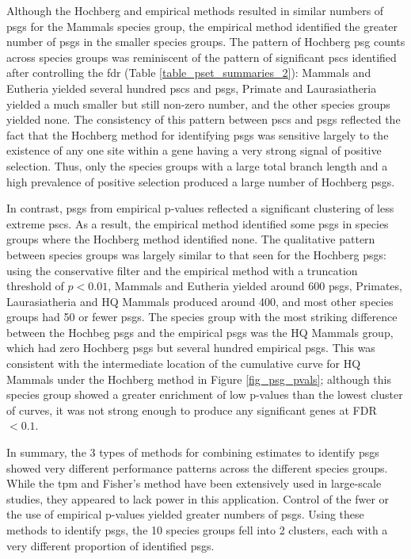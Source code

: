 Although the Hochberg and empirical methods resulted in similar
numbers of \acp{psg} for the Mammals species group, the empirical
method identified the greater number of \acp{psg} in the smaller
species groups. The pattern of Hochberg \ac{psg} counts across species
groups was reminiscent of the pattern of significant \acp{psc}
identified after controlling the \ac{fdr} (Table
\ref{table_pset_summaries_2}): Mammals and Eutheria yielded several
hundred \acp{psc} and \acp{psg}, Primate and Laurasiatheria yielded a
much smaller but still non-zero number, and the other species groups
yielded none. The consistency of this pattern between \acp{psc} and
\acp{psg} reflected the fact that the Hochberg method for identifying
\acp{psg} was sensitive largely to the existence of any one site
within a gene having a very strong signal of positive selection. Thus,
only the species groups with a large total branch length and a high
prevalence of positive selection produced a large number of Hochberg
\acp{psg}.

In contrast, \acp{psg} from empirical p-values reflected a significant
clustering of less extreme \acp{psc}. As a result, the empirical
method identified some \acp{psg} in species groups where the Hochberg
method identified none. The qualitative pattern between species groups
was largely similar to that seen for the Hochberg \acp{psg}: using the
conservative filter and the empirical method with a truncation
threshold of $p<0.01$, Mammals and Eutheria yielded around 600
\acp{psg}, Primates, Laurasiatheria and HQ Mammals produced around
400, and most other species groups had 50 or fewer \acp{psg}. The
species group with the most striking difference between the Hochbeg
\acp{psg} and the empirical \acp{psg} was the HQ Mammals group, which
had zero Hochberg \acp{psg} but several hundred empirical
\acp{psg}. This was consistent with the intermediate location of the
cumulative curve for HQ Mammals under the Hochberg method in Figure
\ref{fig_psg_pvals}; although this species group showed a greater
enrichment of low p-values than the lowest cluster of curves, it was
not strong enough to produce any significant genes at FDR$<0.1$.

In summary, the 3 types of methods for combining \sw estimates to
identify \acp{psg} showed very different performance patterns across
the different species groups. While the \ac{tpm} and Fisher's method
have been extensively used in large-scale studies, they appeared to
lack power in this application. Control of the \ac{fwer} or the use of
empirical p-values yielded greater numbers of \acp{psg}. Using these
methods to identify \acp{psg}, the 10 species groups fell into 2
clusters, each with a very different proportion of identified
\acp{psg}.

